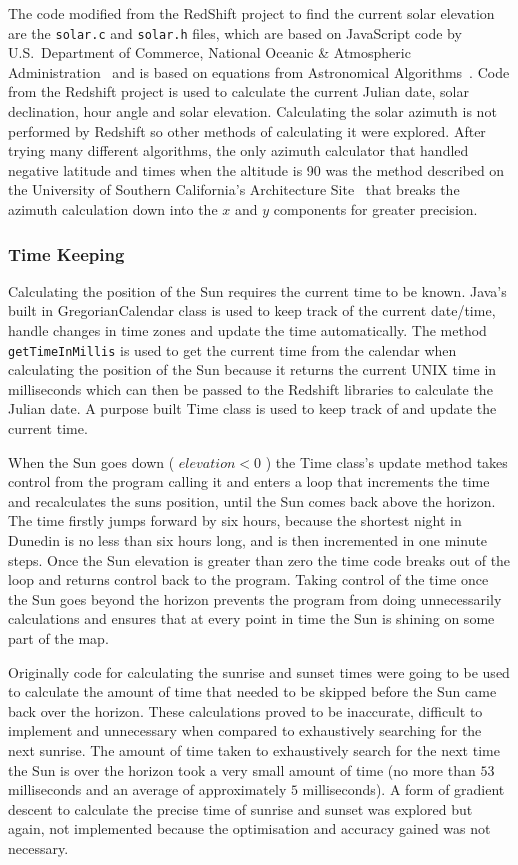 \documentclass[12pt]{report}
\begin{document}
The code modified from the RedShift project to find the current solar elevation are the \texttt{solar.c} and \texttt{solar.h} files, which are based on JavaScript code by U.S.\ Department of Commerce, National Oceanic {\&} Atmospheric Administration~\cite{usnoaa} and is based on equations from Astronomical Algorithms~\cite{astronomicalalgorithms}. Code from the Redshift project is used to calculate the current Julian date, solar declination, hour angle and solar elevation. Calculating the solar azimuth is not performed by Redshift so other methods of calculating it were explored. After trying many different algorithms, the only azimuth calculator that handled negative latitude and times when the altitude is 90{\degree} was the method described on the University of Southern California's Architecture Site~\cite{solarazi} that breaks the azimuth calculation down into the $x$ and $y$ components for greater precision.

\subsubsection{Time Keeping}
Calculating the position of the Sun requires the current time to be known. Java's built in GregorianCalendar class is used to keep track of the current date/time, handle changes in time zones and update the time automatically. The method \texttt{getTimeInMillis} is used to get the current time from the calendar when calculating the position of the Sun because it returns the current UNIX time in milliseconds which can then be passed to the Redshift libraries to calculate the Julian date. A purpose built Time class is used to keep track of and update the current time.

When the Sun goes down ( $\mathit{elevation} < 0$ ) the Time class's update method takes control from the program calling it and enters a loop that increments the time and recalculates the suns position, until the Sun comes back above the horizon. The time firstly jumps forward by six hours, because the shortest night in Dunedin is no less than six hours long, and is then incremented in one minute steps. Once the Sun elevation is greater than zero the time code breaks out of the loop and returns control back to the program. Taking control of the time once the Sun goes beyond the horizon prevents the program from doing unnecessarily calculations and ensures that at every point in time the Sun is shining on some part of the map. 

Originally code for calculating the sunrise and sunset times were going to be used to calculate the amount of time that needed to be skipped before the Sun came back over the horizon. These calculations proved to be inaccurate, difficult to implement and unnecessary when compared to exhaustively searching for the next sunrise. The amount of time taken to exhaustively search for the next time the Sun is over the horizon took a very small amount of time (no more than $53$ milliseconds and an average of approximately $5$ milliseconds). A form of gradient descent to calculate the precise time of sunrise and sunset was explored but again, not implemented because the optimisation and accuracy gained was not necessary.
\end{document}
